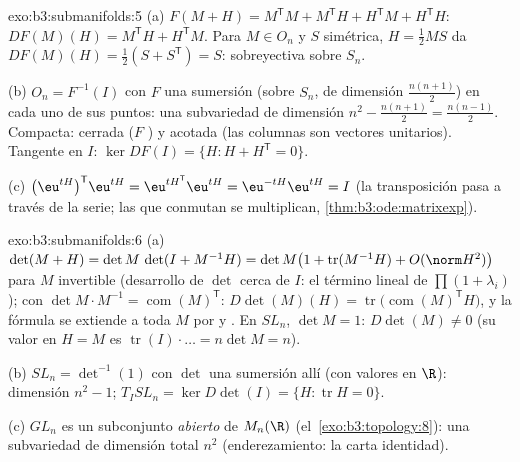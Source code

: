 \begin{solution}{exo:b3:submanifolds:5}
(a) $F(M + H) = M^{\mathsf T}M + M^{\mathsf T}H + H^{\mathsf
T}M + H^{\mathsf T}H$: $DF(M)(H) = M^{\mathsf T}H +
H^{\mathsf T}M$. Para $M \in O_n$ y $S$ simétrica, $H =
\frac12MS$ da $DF(M)(H) = \frac12(S + S^{\mathsf T}) = S$: sobreyectiva
sobre $S_n$.

(b) $O_n = F^{-1}(I)$ con $F$ una sumersión (sobre $S_n$, de dimensión
$\frac{n(n+1)}2$) en cada uno de sus puntos: una subvariedad de
dimensión $n^2 - \frac{n(n+1)}2 =
\frac{n(n-1)}2$. Compacta: cerrada
($F$ ) y acotada (las
columnas son vectores unitarios). Tangente en $I$: $\ker DF(I) =
\{H : H + H^{\mathsf T} = 0\}$.

(c) $\bigl(\eu^{tH}\bigr)^{\mathsf T}\eu^{tH} =
\eu^{tH^{\mathsf T}}\eu^{tH} = \eu^{-tH}\eu^{tH} = I$
(la transposición pasa a través de la serie; las  que conmutan se multiplican,
\cref{thm:b3:ode:matrixexp}).
\end{solution}

\begin{solution}{exo:b3:submanifolds:6}
(a) $\det(M + H) = \det M\,\det(I + M^{-1}H) = \det M\bigl(1
+ \operatorname{tr}(M^{-1}H) + O(\norm H^2)\bigr)$ para $M$ invertible
(desarrollo de $\det$ cerca de $I$: el término lineal de
$\prod(1 + \lambda_i)$); con $\det M\cdot M^{-1} =
\operatorname{com}(M)^{\mathsf T}$:
$D\det(M)(H) = \operatorname{tr}\bigl(\operatorname{com}
(M)^{\mathsf T}H\bigr)$, y la fórmula se extiende a toda $M$ por
 y
. En $SL_n$,
$\det M = 1$: $D\det(M) \ne 0$ (su valor en $H = M$ es
$\operatorname{tr}(I)\cdot\dots = n\det M = n$).

(b) $SL_n = \det^{-1}(1)$ con $\det$ una sumersión allí (con valores en
$\R$): dimensión $n^2 - 1$; $T_ISL_n = \ker
D\det(I) = \{H : \operatorname{tr}H = 0\}$.

(c) $GL_n$ es un subconjunto \emph{abierto} de $M_n(\R)$
(el~\cref{exo:b3:topology:8}): una subvariedad de dimensión total $n^2$
(enderezamiento: la carta identidad).
\end{solution}

